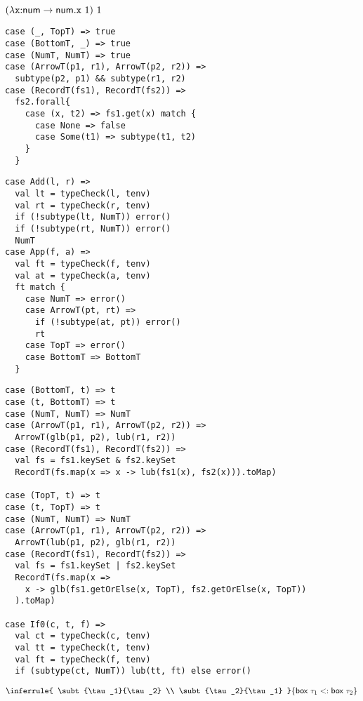 \textbf{}

$(\lambda\texttt{x}{:}\textsf{num}\rightarrow\textsf{num}.\texttt{x}\ 1)\ 1$
\\

\textbf{}
\vspace{-1em}
\begin{verbatim}
case (_, TopT) => true
case (BottomT, _) => true
case (NumT, NumT) => true
case (ArrowT(p1, r1), ArrowT(p2, r2)) =>
  subtype(p2, p1) && subtype(r1, r2)
case (RecordT(fs1), RecordT(fs2)) =>
  fs2.forall{
    case (x, t2) => fs1.get(x) match {
      case None => false
      case Some(t1) => subtype(t1, t2)
    }
  }
\end{verbatim}

\textbf{}
\vspace{-1em}
\begin{verbatim}
case Add(l, r) =>
  val lt = typeCheck(l, tenv)
  val rt = typeCheck(r, tenv)
  if (!subtype(lt, NumT)) error()
  if (!subtype(rt, NumT)) error()
  NumT
case App(f, a) =>
  val ft = typeCheck(f, tenv)
  val at = typeCheck(a, tenv)
  ft match {
    case NumT => error()
    case ArrowT(pt, rt) =>
      if (!subtype(at, pt)) error()
      rt
    case TopT => error()
    case BottomT => BottomT
  }
\end{verbatim}

\textbf{}
\vspace{-1em}
\begin{verbatim}
case (BottomT, t) => t
case (t, BottomT) => t
case (NumT, NumT) => NumT
case (ArrowT(p1, r1), ArrowT(p2, r2)) =>
  ArrowT(glb(p1, p2), lub(r1, r2))
case (RecordT(fs1), RecordT(fs2)) =>
  val fs = fs1.keySet & fs2.keySet
  RecordT(fs.map(x => x -> lub(fs1(x), fs2(x))).toMap)

case (TopT, t) => t
case (t, TopT) => t
case (NumT, NumT) => NumT
case (ArrowT(p1, r1), ArrowT(p2, r2)) =>
  ArrowT(lub(p1, p2), glb(r1, r2))
case (RecordT(fs1), RecordT(fs2)) =>
  val fs = fs1.keySet | fs2.keySet
  RecordT(fs.map(x =>
    x -> glb(fs1.getOrElse(x, TopT), fs2.getOrElse(x, TopT))
  ).toMap)

case If0(c, t, f) =>
  val ct = typeCheck(c, tenv)
  val tt = typeCheck(t, tenv)
  val ft = typeCheck(f, tenv)
  if (subtype(ct, NumT)) lub(tt, ft) else error()
\end{verbatim}

\textbf{}
\[
\inferrule
{ \subt{\tau_1}{\tau_2} \\ \subt{\tau_2}{\tau_1} }
{ \subt{\textsf{box}\ \tau_1}{\textsf{box}\ \tau_2} }
\]

